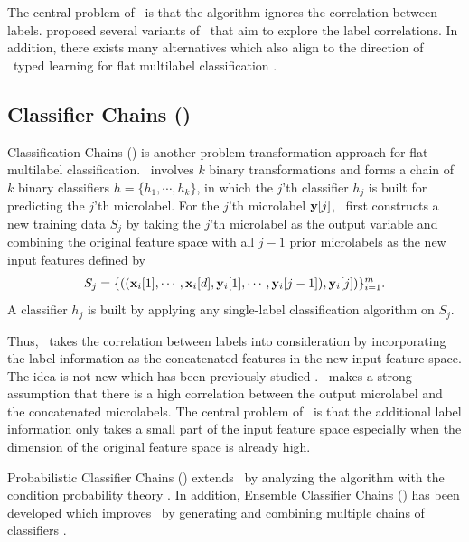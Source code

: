 {The central problem of \mlknn\ is that the algorithm ignores the correlation between labels.
\citet{Cheng09combining,Younes11a} proposed several variants of \mlknn\ that aim to explore the label correlations.
In addition, there exists many alternatives which also align to the direction of \knn\ typed learning for flat multilabel classification \citep{Brinker07case,Chiang12a}.



%
%
\subsection{Classifier Chains (\cc)}

Classification Chains (\cc) \citep{Read09classifier,Read11classifier} is another problem transformation approach for flat multilabel classification.
\cc\ involves $k$ binary transformations and forms a chain of $k$ binary classifiers $h=\{h_1,\cdots,h_k\}$, in which the $j$'th classifier $h_j$ is built for predicting the $j$'th microlabel.
For the $j$'th microlabel $\mathbf {y}[j]$, \cc\ first constructs a new training data $S_j$ by taking the $j$'th microlabel as the output variable and combining the original feature space with all $j-1$ prior microlabels as the new input features defined by
\begin{align*}
	S_j = \{((\mathbf {x}_i[1],\cdots,\mathbf {x}_i[d],\mathbf {y}_i[1],\cdots,\mathbf {y}_i[j-1]),\mathbf {y}_i[j])\}_{i=1}^{m}.
\end{align*}
A classifier $h_j$ is built by applying any single-label classification algorithm on $S_j$.

Thus, \cc\ takes the correlation between labels into consideration by incorporating the label information as the concatenated features in the new input feature space.
The idea is not new which has been previously studied \citep{Godbole04discriminative}.
\cc\ makes a strong assumption that there is a high correlation between the output microlabel and the concatenated microlabels.
The central problem of \cc\ is that the additional label information only takes a small part of the input feature space especially when the dimension of the original feature space is already high.

Probabilistic Classifier Chains (\pcc) extends \cc\ by analyzing the algorithm with the condition probability theory \citep{Read09classifier,Dembczynski10bayes}.
In addition, Ensemble Classifier Chains (\ecc) has been developed which improves \cc\ by generating and combining multiple chains of classifiers \citep{Read11classifier}. 



}
